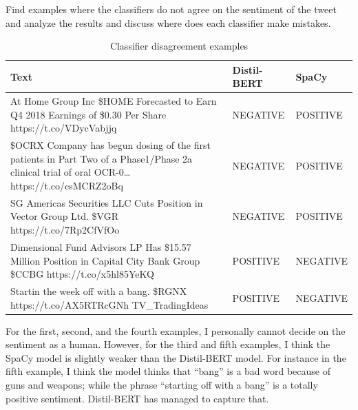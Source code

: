 \documentclass[12pt]{article}
\begin{document}
\begin{qsolve}[Task]
    Find examples where the classifiers do not agree on the sentiment of 
    the tweet and analyze the results and discuss where does each 
    classifier make mistakes.
\end{qsolve}

\begin{table}[h!]
    \centering
    \begin{tabular}{ || m{25em} | m{8em}| m{5em} || }
        \hline
        \textbf{Text} & \textbf{Distil-BERT} & \textbf{SpaCy} \\ 
        \hline

        At Home Group Inc \$HOME Forecasted to Earn Q4 2018 Earnings 
        of \$0.30 Per Share https://t.co/VDycVabjjq & NEGATIVE & POSITIVE\\
        \hline

        \$OCRX Company has begun dosing of the first patients in Part Two of 
        a Phase1/Phase 2a clinical trial of oral OCR-0… 
        https://t.co/csMCRZ2oBq & NEGATIVE & POSITIVE\\
        \hline

        SG Americas Securities LLC Cuts Position in Vector Group Ltd. \$VGR 
        https://t.co/7Rp2CfVfOo & NEGATIVE & POSITIVE\\
        \hline

        Dimensional Fund Advisors LP Has \$15.57 Million Position in Capital 
        City Bank Group \$CCBG https://t.co/x5hl85YeKQ & POSITIVE & NEGATIVE \\
        \hline

        Startin the week off with a bang. \$RGNX https://t.co/AX5RTRcGNh 
        TV\_TradingIdeas & POSITIVE & NEGATIVE \\
        \hline
    \end{tabular}
    \caption{Classifier disagreement examples}
    \label{table:P3.t1}
\end{table}

For the first, second, and the fourth examples, I personally cannot decide
on the sentiment as a human. However, for the third and fifth examples, I
think the SpaCy model is slightly weaker than the Distil-BERT model.
For instance in the fifth example, I think the model thinks that ``bang''
is a bad word because of guns and weapons; while the phrase ``starting off with a bang''
is a totally positive sentiment. Distil-BERT has managed to capture that.

\pagebreak
\end{document}
